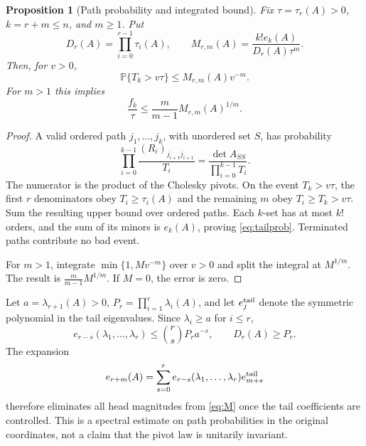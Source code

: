 \documentclass[11pt]{article}
\newtheorem{proposition}[theorem]{Proposition}
\theoremstyle{remark}\newtheorem{remark}[theorem]{Remark}
\newcommand{\Prob}{\mathbb P}
\begin{document}
\begin{proposition}[Path probability and integrated bound]\label{prop:path}
Fix $\tau=\tau_r(A)>0$, $k=r+m\le n$, and $m\ge1$. Put
\begin{equation}
 D_r(A)=\prod_{i=0}^{r-1}\tau_i(A),\qquad
 M_{r,m}(A)=\frac{k!e_k(A)}{D_r(A)\tau^m}. \label{eq:M}
\end{equation}
Then, for $v>0$,
\begin{equation}
 \Prob\{T_k>v\tau\}\le M_{r,m}(A)v^{-m}. \label{eq:tailprob}
\end{equation}
For $m>1$ this implies
\begin{equation}
 \frac{f_k}{\tau}\le\frac{m}{m-1}M_{r,m}(A)^{1/m}. \label{eq:integrated}
\end{equation}
\end{proposition}
\begin{proof}
A valid ordered path $j_1,\ldots,j_k$, with unordered set $S$, has probability
\[
 \prod_{i=0}^{k-1}\frac{(R_i)_{j_{i+1}j_{i+1}}}{T_i}
 =\frac{\det A_{SS}}{\prod_{i=0}^{k-1}T_i}.
\]
The numerator is the product of the Cholesky pivots. On the event $T_k>v\tau$, the first $r$ denominators obey $T_i\ge\tau_i(A)$ and the remaining $m$ obey $T_i\ge T_k>v\tau$. Sum the resulting upper bound over ordered paths. Each $k$-set has at most $k!$ orders, and the sum of its minors is $e_k(A)$, proving \eqref{eq:tailprob}. Terminated paths contribute no bad event.

For $m>1$, integrate $\min\{1,Mv^{-m}\}$ over $v>0$ and split the integral at $M^{1/m}$. The result is $\frac{m}{m-1}M^{1/m}$. If $M=0$, the error is zero.
\end{proof}

Let $a=\lambda_{r+1}(A)>0$, $P_r=\prod_{i=1}^r\lambda_i(A)$, and let $e_j^{\rm tail}$ denote the symmetric polynomial in the tail eigenvalues. Since $\lambda_i\ge a$ for $i\le r$,
\begin{equation}
 e_{r-s}(\lambda_1,\ldots,\lambda_r)
 \le {r\choose s}P_r a^{-s},\qquad D_r(A)\ge P_r. \label{eq:head}
\end{equation}
The expansion
\begin{equation}
 e_{r+m}(A)=\sum_{s=0}^r
 e_{r-s}(\lambda_1,\ldots,\lambda_r)e_{m+s}^{\rm tail} \label{eq:split}
\end{equation}
therefore eliminates all head magnitudes from \eqref{eq:M} once the tail coefficients are controlled. This is a spectral estimate on path probabilities in the original coordinates, not a claim that the pivot law is unitarily invariant.
\end{document}
